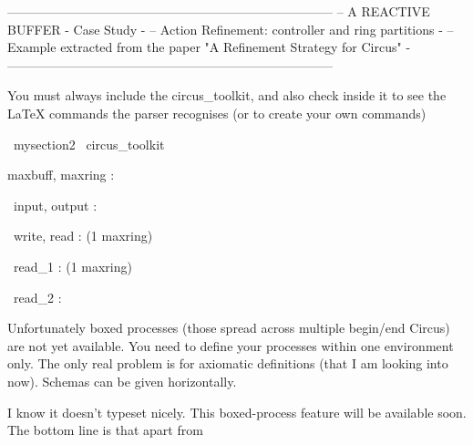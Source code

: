 -----------------------------------------------------------------------------
-- A REACTIVE BUFFER    - Case Study                                                                                    -
-- Action Refinement: controller and ring partitions                                                -
-- Example extracted from the paper "A Refinement Strategy for Circus"          -
-----------------------------------------------------------------------------

You must always include the circus\_toolkit, and also check inside
it to see the LaTeX commands the parser recognises (or to create
your own commands)

\begin{zsection}
  \SECTION\ mysection2 \parents\ circus\_toolkit
\end{zsection}

\begin{axdef}
 maxbuff, maxring : \nat
\end{axdef}

\begin{circus}
 \circchannel\ input, output : \nat
\end{circus}

\begin{circus}
 \circchannel\ write, read : (1 \upto maxring) \cross \nat
\end{circus}

\begin{circus}
 \circchannel\ read\_1 : (1 \upto maxring)
\end{circus}

\begin{circus}
 \circchannel\ read\_2 : \nat
\end{circus}

Unfortunately boxed processes (those spread across multiple
begin/end Circus) are not yet available. You need to define your
processes within one environment only. The only real problem is for
axiomatic definitions (that I am looking into now). Schemas can be
given horizontally.

I know it doesn't typeset nicely. This boxed-process feature will be
available soon. The bottom line is that apart from


